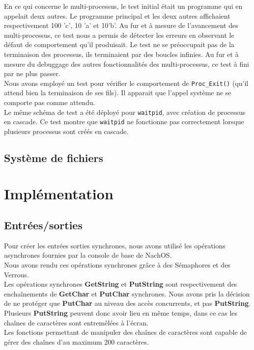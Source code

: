 \documentclass{report}
\begin{document}
En ce qui concerne le multi-processus, le test initial était un programme qui en appelait deux autres. Le programme principal et les deux autres affichaient respectivement 100 'c', 10 'a' et 10'b'. Au fur et à mesure de l'avancement des multi-processus, ce test nous a permis de détecter les erreurs en observant le défaut de comportement qu'il produisait. Le test ne se préoccupait pas de la terminaison des processus, ils terminaient par des boucles infinies. Au fur et à mesure du debuggage des autres fonctionnalités des multi-processus, ce test à fini par ne plus passer.\\
Nous avons employé un test pour vérifier le comportement de \texttt{Proc\_Exit()} (qu'il attend bien la terminaison de ses fils). Il apparait que l'appel système ne se comporte pas comme attendu.\\
Le même schéma de test a été déployé pour \texttt{waitpid}, avec création de processus en cascade. Ce test montre que \texttt{waitpid} ne fonctionne pas correctement lorsque plusieurs processus sont créés en cascade.

\subsection*{Système de fichiers}



\section*{Implémentation}
\subsection*{Entrées/sorties}

Pour créer les entrées sorties synchrones, nous avons utilisé les opérations asynchrones fournies par la console de base de NachOS.\\
Nous avons rendu ces opérations synchrones grâce à des Sémaphores et des Verrous.\\
Les opérations synchrones \textbf{GetString} et \textbf{PutString} sont respectivement des enchaînements de \textbf{GetChar} et \textbf{PutChar} synchrones.
Nous avons pris la décision de ne protéger que \textbf{PutChar} au niveau des accès concurrents, et pas \textbf{PutString}. Plusieurs \textbf{PutString} peuvent donc avoir lieu en même temps, dans ce cas les chaînes de caractères sont entremêlées à l'écran.\\
Les fonctions permettant de manipuler des chaînes de caractères sont capable de gérer des chaînes d'au maximum 200 caractères.\\
\end{document}
